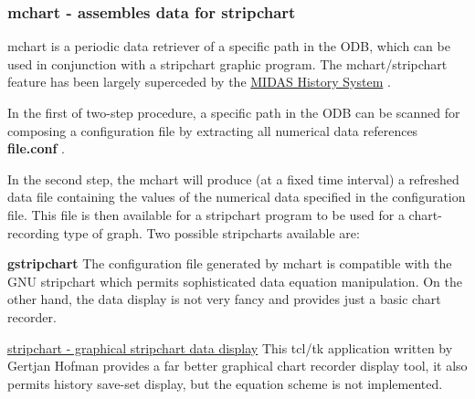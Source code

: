 \par


\par


\par


\label{F_LogUtil_idx_mchart-utility}
\hypertarget{F_LogUtil_idx_mchart-utility}{}
 \label{F_LogUtil_idx_stripchart}
\hypertarget{F_LogUtil_idx_stripchart}{}
 \hypertarget{F_LogUtil_F_mchart_utility}{}\subsubsection{mchart       -\/ assembles data for stripchart}\label{F_LogUtil_F_mchart_utility}
mchart is a periodic data retriever of a specific path in the ODB, which can be used in conjunction with a stripchart graphic program. The mchart/stripchart feature has been largely superceded by the \hyperlink{F_History_logging_F_History_System}{MIDAS History System} .


\begin{DoxyItemize}
\item In the first of two-\/step procedure, a specific path in the ODB can be scanned for composing a configuration file by extracting all numerical data references {\bfseries file.conf} .
\item In the second step, the mchart will produce (at a fixed time interval) a refreshed data file containing the values of the numerical data specified in the configuration file. This file is then available for a stripchart program to be used for a chart-\/recording type of graph. Two possible stripcharts available are:
\end{DoxyItemize}

\label{F_LogUtil_F_gstripchart}
\hypertarget{F_LogUtil_F_gstripchart}{}



\begin{DoxyItemize}
\item {\bfseries gstripchart} The configuration file generated by mchart is compatible with the GNU stripchart which permits sophisticated data equation manipulation. On the other hand, the data display is not very fancy and provides just a basic chart recorder.
\item \hyperlink{F_LogUtil_F_stripchartfile}{stripchart -\/ graphical stripchart data display} This tcl/tk application written by Gertjan Hofman provides a far better graphical chart recorder display tool, it also permits history save-\/set display, but the equation scheme is not implemented.
\end{DoxyItemize}


